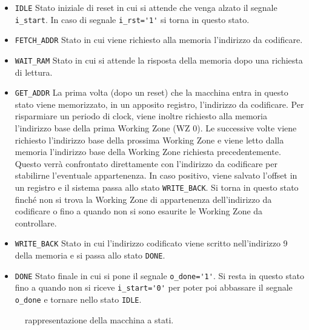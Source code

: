 \begin{itemize}[itemsep=10pt]
	\item \texttt{IDLE}\newline
	Stato iniziale di reset in cui si attende che venga alzato il segnale \lstinline[columns=fixed]{i_start}. In caso di segnale \lstinline[columns=fixed]{i_rst='1'} si torna in questo stato.
	
	\item \texttt{FETCH\_ADDR}\newline 
	Stato in cui viene richiesto alla memoria l'indirizzo da codificare.
	
	\item \texttt{WAIT\_RAM}\newline
	Stato in cui si attende la risposta della memoria dopo una richiesta di lettura.
	
	\item \texttt{GET\_ADDR}\newline
	La prima volta (dopo un reset) che la macchina entra in questo stato viene memorizzato, in un apposito registro, l'indirizzo da codificare. Per risparmiare un periodo di clock, viene inoltre richiesto alla memoria l'indirizzo base della prima Working Zone (WZ 0).\newline
	Le successive volte viene richiesto l'indirizzo base della prossima Working Zone e viene letto dalla memoria l'indirizzo base della Working Zone richiesta precedentemente. Questo verrà confrontato direttamente con l'indirizzo da codificare per stabilirne l'eventuale appartenenza. In caso positivo, viene salvato l'offset in un registro e il sistema passa allo stato \texttt{WRITE\_BACK}.\newline
	Si torna in questo stato finché non si trova la Working Zone di appartenenza dell'indirizzo da codificare o fino a quando non si sono esaurite le Working Zone da controllare. 
	
	\item \texttt{WRITE\_BACK}\newline
	Stato in cui l'indirizzo codificato viene scritto nell'indirizzo 9 della memoria e si passa allo stato \texttt{DONE}.
		
	\item \texttt{DONE}\newline
	Stato finale in cui si pone il segnale \lstinline[columns=fixed]{o_done='1'}.\newline
	Si resta in questo stato fino a quando non si riceve \lstinline[columns=fixed]{i_start='0'} per poter poi abbassare il segnale \lstinline[columns=fixed]{o_done} e tornare nello stato \texttt{IDLE}.
\end{itemize}

\begin{figure}[!htb]
	
	
	\caption{rappresentazione della macchina a stati.}	
	\label{fig:fsm_1}
\end{figure}
